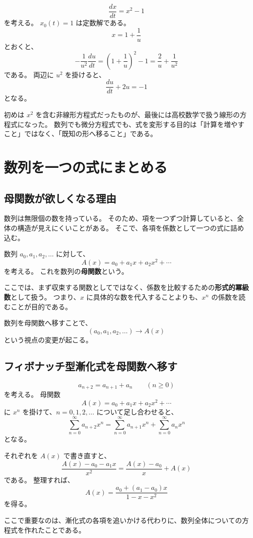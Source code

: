 \[
  \frac{dx}{dt}=x^2-1
\]
を考える。
$x_0(t)=1$ は定数解である。
\[
  x=1+\frac1u
\]
とおくと、
\[
  -\frac1{u^2}\frac{du}{dt}
  =\left(1+\frac1u\right)^2-1
  =\frac2u+\frac1{u^2}
\]
である。
両辺に $u^2$ を掛けると、
\[
  \frac{du}{dt}+2u=-1
\]
となる。

初めは $x^2$ を含む非線形方程式だったものが、最後には高校数学で扱う線形の方程式になった。
数列でも微分方程式でも、式を変形する目的は「計算を増やすこと」ではなく、「既知の形へ移ること」である。

\section{数列を一つの式にまとめる}

\subsection{母関数が欲しくなる理由}

数列は無限個の数を持っている。
そのため、項を一つずつ計算していると、全体の構造が見えにくいことがある。
そこで、各項を係数として一つの式に詰め込む。

数列 $a_0,a_1,a_2,\ldots$ に対して、
\[
  A(x)=a_0+a_1x+a_2x^2+\cdots
\]
を考える。
これを数列の\textbf{母関数}という。

ここでは、まず収束する関数としてではなく、係数を比較するための\textbf{形式的冪級数}として扱う。
つまり、$x$ に具体的な数を代入することよりも、$x^n$ の係数を読むことが目的である。

数列を母関数へ移すことで、
\[
  (a_0,a_1,a_2,\ldots)
  \longrightarrow A(x)
\]
という視点の変更が起こる。

\subsection{フィボナッチ型漸化式を母関数へ移す}

\[
  a_{n+2}=a_{n+1}+a_n
  \qquad(n\geq0)
\]
を考える。
母関数
\[
  A(x)=a_0+a_1x+a_2x^2+\cdots
\]
に $x^n$ を掛けて、$n=0,1,2,\ldots$ について足し合わせると、
\[
  \sum_{n=0}^{\infty}a_{n+2}x^n
  =\sum_{n=0}^{\infty}a_{n+1}x^n
  +\sum_{n=0}^{\infty}a_nx^n
\]
となる。

それぞれを $A(x)$ で書き直すと、
\[
  \frac{A(x)-a_0-a_1x}{x^2}
  =\frac{A(x)-a_0}{x}+A(x)
\]
である。
整理すれば、
\[
  A(x)=\frac{a_0+(a_1-a_0)x}{1-x-x^2}
\]
を得る。

ここで重要なのは、漸化式の各項を追いかける代わりに、数列全体についての方程式を作れたことである。

